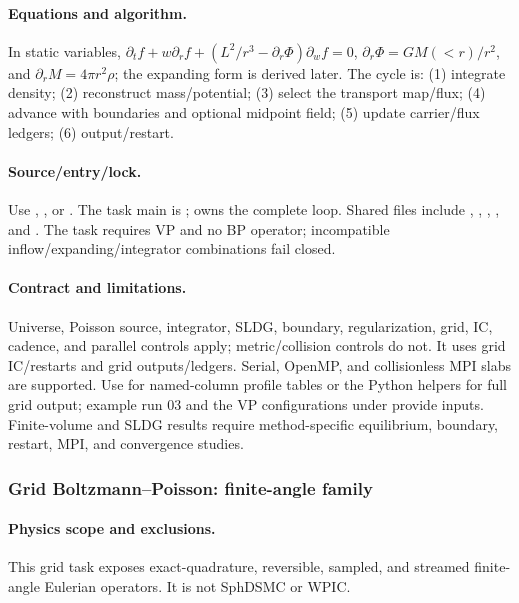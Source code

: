 \paragraph{Equations and algorithm.}
In static variables,
\(\partial_t f+w\partial_r f+(L^2/r^3-\partial_r\Phi)\partial_w f=0\),
\(\partial_r\Phi=GM(<r)/r^2\), and
\(\partial_rM=4\pi r^2\rho\); the expanding form is derived later.  The cycle
is: (1) integrate density; (2) reconstruct mass/potential; (3) select the
transport map/flux; (4) advance with boundaries and optional midpoint field;
(5) update carrier/flux ledgers; (6) output/restart.
\paragraph{Source/entry/lock.}
Use , , or
.  The task main is
;
 owns the complete loop.  Shared files include
,
,
,
, and
.  The task requires VP and no BP
operator; incompatible inflow/expanding/integrator combinations fail closed.
\paragraph{Contract and limitations.}
Universe, Poisson source, integrator, SLDG, boundary, regularization, grid, IC,
cadence, and parallel controls apply; metric/collision controls do not.  It
uses grid IC/restarts and grid outputs/ledgers.  Serial, OpenMP, and
collisionless MPI slabs are supported.  Use
 for named-column profile tables or the
Python  helpers for full grid output;
example run 03 and the VP configurations under
 provide inputs.  Finite-volume and SLDG results
require method-specific equilibrium, boundary, restart, MPI, and convergence
studies.

\subsubsection{Grid Boltzmann--Poisson: finite-angle family}
\paragraph{Physics scope and exclusions.}
This grid task exposes exact-quadrature, reversible, sampled, and
streamed finite-angle Eulerian operators.  It is not SphDSMC or WPIC.

